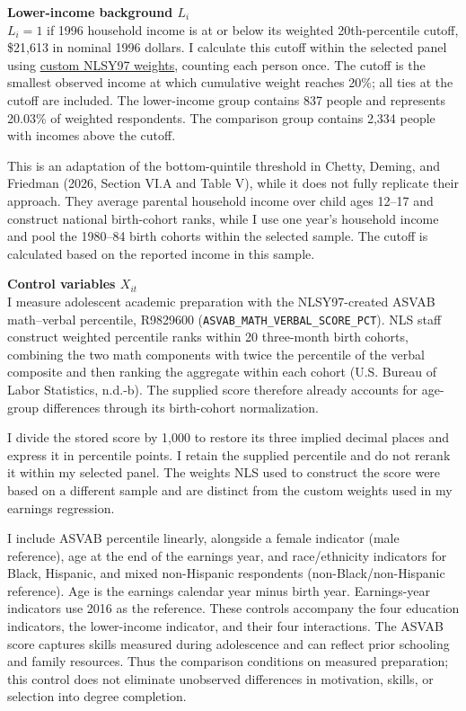 \documentclass[12pt,letterpaper]{article}
\begin{document}
\textbf{Lower-income background $L_i$}\\
$L_i=1$ if 1996 household income is at or below its weighted 20th-percentile cutoff,
\$21,613 in nominal 1996 dollars. I calculate this cutoff within the selected panel using
\href{https://www.nlsinfo.org/content/weights/nlsy97}{custom NLSY97 weights}, counting
each person once. The cutoff is the smallest observed income at which cumulative
weight reaches 20\%; all ties at the cutoff are included. The lower-income group
contains 837 people and represents 20.03\% of weighted respondents. The comparison
group contains 2,334 people with incomes above the cutoff.\newline

This is an adaptation of the bottom-quintile threshold in Chetty, Deming, and
Friedman (2026, Section VI.A and Table V), while it does not fully replicate 
their approach. They average parental household income over child ages 12--17 
and construct national birth-cohort ranks, while I use one year's household 
income and pool the 1980--84 birth cohorts within the selected sample. The cutoff 
is calculated based on the reported income in this sample.\newline

\textbf{Control variables $X_{it}$}\\
I measure adolescent academic preparation with the NLSY97-created ASVAB
math--verbal percentile, R9829600
(\texttt{ASVAB\_MATH\_VERBAL\_SCORE\_PCT}). NLS staff construct weighted 
percentile ranks within 20 three-month birth cohorts, combining the two math 
components with twice the percentile of the verbal composite and then ranking 
the aggregate within each cohort (U.S. Bureau of Labor Statistics, n.d.-b). 
The supplied score therefore already accounts for age-group differences through
its birth-cohort normalization.\newline

I divide the stored score by 1,000 to restore its three implied decimal places and
express it in percentile points. I retain the supplied percentile and do not rerank
it within my selected panel. The weights NLS used to construct the score were based
on a different sample and are
distinct from the custom weights used in my earnings regression.\newline

I include ASVAB percentile linearly, alongside a female indicator (male reference),
age at the end of the earnings year, and race/ethnicity indicators for Black,
Hispanic, and mixed non-Hispanic respondents (non-Black/non-Hispanic reference).
Age is the earnings calendar year minus birth year. Earnings-year indicators use
2016 as the reference. These controls accompany the four education indicators,
the lower-income indicator, and their four interactions. The ASVAB score captures skills measured during
adolescence and can reflect prior schooling and family resources. Thus the
comparison conditions on measured preparation; this control does not eliminate
unobserved differences in motivation, skills, or selection into degree completion.\newline
\end{document}
